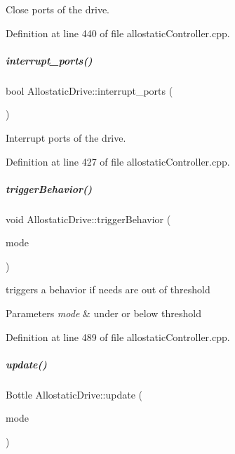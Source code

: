 Close ports of the drive. 



Definition at line 440 of file allostatic\+Controller.\+cpp.

\mbox{\label{group__allostaticController_a7344034cd5c68b5a9580e3bc0bd35c6b}} 
\subparagraph{\texorpdfstring{interrupt\+\_\+ports()}{interrupt\_ports()}}
{\footnotesize\ttfamily bool Allostatic\+Drive\+::interrupt\+\_\+ports (\begin{DoxyParamCaption}{ }\end{DoxyParamCaption})}



Interrupt ports of the drive. 



Definition at line 427 of file allostatic\+Controller.\+cpp.

\mbox{\label{group__allostaticController_a70e9a461682da34e29e77d5d85d5a11c}} 
\subparagraph{\texorpdfstring{trigger\+Behavior()}{triggerBehavior()}}
{\footnotesize\ttfamily void Allostatic\+Drive\+::trigger\+Behavior (\begin{DoxyParamCaption}\item[{\hyperlink{group__allostaticController_gaf40887c05ba83b6f4c0809ce4716dcbc}{Out\+CZ}}]{mode }\end{DoxyParamCaption})}



triggers a behavior if needs are out of threshold 


\begin{DoxyParams}{Parameters}
{\em mode} & under or below threshold \\
\hline
\end{DoxyParams}


Definition at line 489 of file allostatic\+Controller.\+cpp.

\mbox{\label{group__allostaticController_a2d05d5861a68c6b8126b5d1d6fb97f69}} 
\subparagraph{\texorpdfstring{update()}{update()}}
{\footnotesize\ttfamily Bottle Allostatic\+Drive\+::update (\begin{DoxyParamCaption}\item[{\hyperlink{group__allostaticController_gab2a3f165075ddd5df4b2f6910928a311}{Drive\+Update\+Mode}}]{mode }\end{DoxyParamCaption})}



